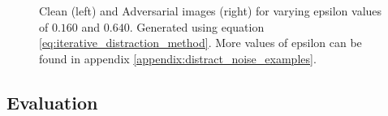 \begin{figure}[h]
    \centering
    \vspace{\floatsep}
    \vspace{\floatsep}
    \vspace{\floatsep}
    \caption{Clean (left) and Adversarial images (right) for varying epsilon values of $0.160$ and $0.640$. Generated using equation \ref{eq:iterative_distraction_method}. More values of epsilon can be found in appendix \ref{appendix:distract_noise_examples}.}
    \label{fig:distract_noise_examples}
\end{figure}

\subsection{Evaluation}

